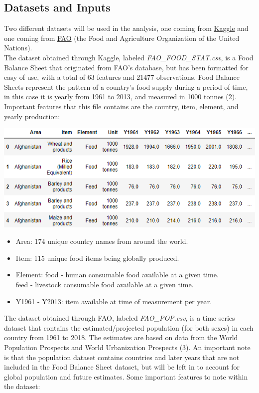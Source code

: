 \documentclass[12pt, a4paper]{article}
\begin{document}
\begin{spacing}{1.1}
	\section{Datasets and Inputs}
	Two different datasets will be used in the analysis, one coming from \href{https://www.kaggle.com/dorbicycle/world-foodfeed-production}{Kaggle} and one coming from \href{http://www.fao.org/faostat/en/#data/OA}{FAO} (the Food and Agriculture Organization of the United Nations).\vspace*{2mm}\\	
	The dataset obtained through Kaggle, labeled \textit{FAO\_FOOD\_STAT.csv}, is a Food Balance Sheet that originated from FAO's database, but has been formatted for easy of use, with a total of 63 features and 21477 observations. Food Balance Sheets represent the pattern of a country's food supply during a period of time, in this case it is yearly from 1961 to 2013, and measured in 1000 tonnes (2). Important features that this file contains are the country, item, element, and yearly production:
	\begin{center}	\includegraphics[scale=.9]{food_data}	\end{center}
	\begin{itemize}
		\item Area: 174 unique country names from around the world.
		\item Item: 115 unique food items being globally produced.
		\item Element: food - human consumable food available at a given time. \\ 
		\hspace*{16.5mm} feed - livestock consumable food available at a given time.
		\item Y1961 - Y2013: item available at time of measurement per year.
	\end{itemize} \vspace*{2mm}
	The dataset obtained through FAO, labeled \textit{FAO\_POP.csv}, is a time series dataset that contains the estimated/projected population (for both sexes) in each country from 1961 to 2018. The estimates are based on data from the World Population Prospects and World Urbanization Prospects (3). An important note is that the population dataset contains countries and later years that are not included in the Food Balance Sheet dataset, but will be left in to account for global population and future estimates. Some important features to note within the dataset:

\end{spacing}
\end{document}

